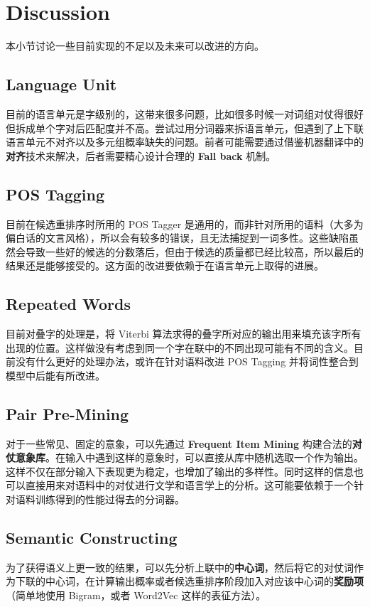 \documentclass[12pt]{article}
\begin{document}
\newpage

\section{Discussion}

本小节讨论一些目前实现的不足以及未来可以改进的方向。

\subsection{Language Unit}

目前的语言单元是字级别的，这带来很多问题，比如很多时候一对词组对仗得很好但拆成单个字对后匹配度并不高。尝试过用分词器来拆语言单元，但遇到了上下联语言单元不对齐以及多元组概率缺失的问题。前者可能需要通过借鉴机器翻译中的\textbf{对齐}技术来解决，后者需要精心设计合理的 \textbf{Fall back} 机制。

\subsection{POS Tagging}

目前在候选重排序时所用的 POS Tagger 是通用的，而非针对所用的语料（大多为偏白话的文言风格），所以会有较多的错误，且无法捕捉到一词多性。这些缺陷虽然会导致一些好的候选的分数落后，但由于候选的质量都已经比较高，所以最后的结果还是能够接受的。这方面的改进要依赖于在语言单元上取得的进展。

\subsection{Repeated Words}

目前对叠字的处理是，将 Viterbi 算法求得的叠字所对应的输出用来填充该字所有出现的位置。这样做没有考虑到同一个字在联中的不同出现可能有不同的含义。目前没有什么更好的处理办法，或许在针对语料改进 POS Tagging 并将词性整合到模型中后能有所改进。

\subsection{Pair Pre-Mining}

对于一些常见、固定的意象，可以先通过 \textbf{Frequent Item Mining} 构建合法的\textbf{对仗意象库}。在输入中遇到这样的意象时，可以直接从库中随机选取一个作为输出。这样不仅在部分输入下表现更为稳定，也增加了输出的多样性。同时这样的信息也可以直接用来对语料中的对仗进行文学和语言学上的分析。这可能要依赖于一个针对语料训练得到的性能过得去的分词器。

\subsection{Semantic Constructing}

为了获得语义上更一致的结果，可以先分析上联中的\textbf{中心词}，然后将它的对仗词作为下联的中心词，在计算输出概率或者候选重排序阶段加入对应该中心词的\textbf{奖励项}（简单地使用 Bigram，或者 Word2Vec 这样的表征方法）。
\end{document}
